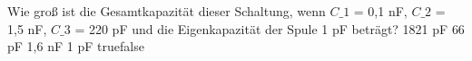     {Wie groß ist die Gesamtkapazität dieser Schaltung, wenn $C\_1$ = 0,1 nF, $C\_2$ = 1,5 nF, $C\_3$ = 220 pF und die Eigenkapazität der Spule 1 pF beträgt?}
    {1821 pF}
    {66 pF}
    {1,6 nF}
    {1 pF}
    {true}{false}